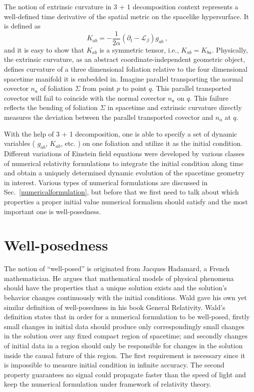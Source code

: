 The notion of extrinsic curvature in 3 + 1 decomposition context represents a well-defined time derivative of the spatial metric on the spacelike hypersurface. It is defined as
\begin{equation}\label{extrinsic}
K_{ab} = - \frac{1}{2\alpha}(\partial_{t} - \mathcal{L}_{\beta})g_{ab} \ ,
\end{equation}
and it is easy to show that $K_{ab}$ is a symmetric tensor, i.e., $K_{ab} = K_{ba}$. Physically, the extrinsic curvature, as an abstract coordinate-independent geometric object, defines curvature of a three dimensional foliation relative to the four dimensional spacetime manifold it is embedded in. Imagine parallel transporting the normal covector $n_{a}$ of foliation $\Sigma$ from point $p$ to point $q$. This parallel transported covector will fail to coincide with the normal covector $n_{a}$ on $q$. This failure reflects the bending of foliation $\Sigma$ in spacetime and extrinsic curvature directly measures the deviation between the parallel transported covector and $n_{a}$ at $q$. 

With the help of 3 + 1 decomposition, one is able to specify a set of dynamic variables ( $g_{ab}$, $K_{ab}$, etc. ) on one foliation and utilize it as the initial condition. Different variations of Einstein field equations were developed by various classes of numerical relativity formulations to integrate the initial condition along time and obtain a uniquely determined dynamic evolution of the spacetime geometry in interest. Various types of  numerical formulations are discussed in Sec.~\ref{numericalformulation}, but before that we first need to talk about which properties a proper initial value numerical formalism should satisfy and the most important one is well-posedness.  
\section{Well-posedness}\label{wellposedness}
The notion of ``well-posed'' is originated from Jacques Hadamard, a French mathematician. He argues that mathematical models of physical phenomena should have the properties that a unique solution exists and the solution's behavior changes continuously with the initial conditions. Wald gave his own yet similar definition of well-posedness in his book General Relativity. Wald's definition states that in order for a numerical formulation to be well-posed, firstly small changes in initial data should produce only correspondingly small changes in the solution over any fixed compact region of spacetime; and secondly changes of initial data in a region should only be responsible for changes in the solution inside the causal future of this region. The first requirement is necessary since it is impossible to measure initial condition in infinite accuracy. The second property guarantees no signal could propagate faster than the speed of light and keep the numerical formulation under framework of relativity theory. 

